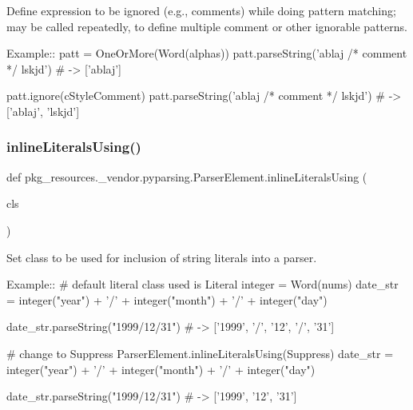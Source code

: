 \begin{DoxyVerb}Define expression to be ignored (e.g., comments) while doing pattern
matching; may be called repeatedly, to define multiple comment or other
ignorable patterns.

Example::
    patt = OneOrMore(Word(alphas))
    patt.parseString('ablaj /* comment */ lskjd') # -> ['ablaj']
    
    patt.ignore(cStyleComment)
    patt.parseString('ablaj /* comment */ lskjd') # -> ['ablaj', 'lskjd']
\end{DoxyVerb}
 \mbox{\label{classpkg__resources_1_1__vendor_1_1pyparsing_1_1_parser_element_a0cc7c1046ec15301a82d135bad3190ba}} 
\subsubsection{\texorpdfstring{inline\+Literals\+Using()}{inlineLiteralsUsing()}}
{\footnotesize\ttfamily def pkg\+\_\+resources.\+\_\+vendor.\+pyparsing.\+Parser\+Element.\+inline\+Literals\+Using (\begin{DoxyParamCaption}\item[{}]{cls }\end{DoxyParamCaption})\hspace{0.3cm}{\ttfamily [static]}}

\begin{DoxyVerb}Set class to be used for inclusion of string literals into a parser.

Example::
    # default literal class used is Literal
    integer = Word(nums)
    date_str = integer("year") + '/' + integer("month") + '/' + integer("day")           

    date_str.parseString("1999/12/31")  # -> ['1999', '/', '12', '/', '31']


    # change to Suppress
    ParserElement.inlineLiteralsUsing(Suppress)
    date_str = integer("year") + '/' + integer("month") + '/' + integer("day")           

    date_str.parseString("1999/12/31")  # -> ['1999', '12', '31']
\end{DoxyVerb}
 \mbox{\label{classpkg__resources_1_1__vendor_1_1pyparsing_1_1_parser_element_a8e5f94959acd269bf7ac67458755913a}} 
